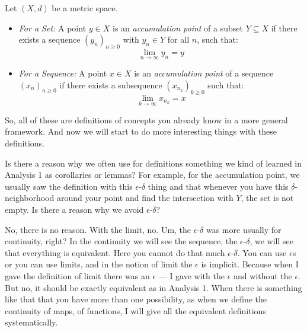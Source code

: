 \begin{math-stroke}
\begin{definition}\label{def:accumulation-point}
Let $(X, d)$ be a metric space.
\begin{itemize}
    \setcounter{enumi}{0} \item \emph{For a Set:} A point $y \in X$ is an \emph{accumulation point} of a subset $Y \subseteq X$ if there exists a sequence $(y_n)_{n \ge 0}$ with $y_n \in Y$ for all $n$, such that:
    \[ \lim_{n \to \infty} y_n = y \]
    \setcounter{enumi}{1} \item \emph{For a Sequence:} A point $x \in X$ is an \emph{accumulation point} of a sequence $(x_n)_{n \ge 0}$ if there exists a subsequence $(x_{n_k})_{k \ge 0}$ such that:
    \[ \lim_{k \to \infty} x_{n_k} = x \]
\end{itemize}
\end{definition}
\end{math-stroke}

\begin{spoken-clean}[00:18:44 - 00:20:18]
So, all of these are definitions of concepts you already know in a more general framework. And now we will start to do more interesting things with these definitions. 
\end{spoken-clean}

\begin{student-question}
Is there a reason why we often use for definitions something we kind of learned in Analysis 1 as corollaries or lemmas? For example, for the accumulation point, we usually saw the definition with this $\epsilon$-$\delta$ thing and that whenever you have this $\delta$-neighborhood around your point and find the intersection with $Y$, the set is not empty. Is there a reason why we avoid $\epsilon$-$\delta$?
\end{student-question}

\begin{spoken-clean}[continued]
No, there is no reason. With the limit, no. Um, the $\epsilon$-$\delta$ was more usually for continuity, right? In the continuity we will see the sequence, the $\epsilon$-$\delta$, we will see that everything is equivalent. Here you cannot do that much $\epsilon$-$\delta$. You can use $\epsilon$s or you can use limits, and in the notion of limit the $\epsilon$ is implicit. Because when I gave the definition of limit there was an $\epsilon$ — I gave with the $\epsilon$ and without the $\epsilon$. But no, it should be exactly equivalent as in Analysis 1. When there is something like that that you have more than one possibility, as when we define the continuity of maps, of functions, I will give all the equivalent definitions systematically.
\end{spoken-clean}

